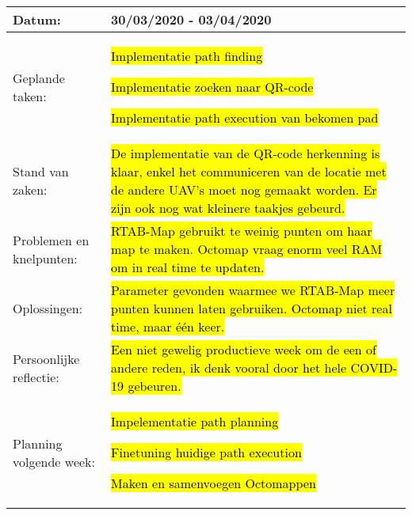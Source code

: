 \begin{tabularx}{\textwidth}{| l | X |}
    \hline
    Datum: & 30/03/2020 - 03/04/2020\\
    \hline
    Geplande taken: &
    \begin{compactitem}
      \item \hl{Implementatie path finding}
      \item \hl{Implementatie zoeken naar QR-code}
      \item \hl{Implementatie path execution van bekomen pad}
    \end{compactitem}\\
    \hline
    Stand van zaken: & \hl{De implementatie van de QR-code herkenning is klaar, enkel het communiceren van de locatie met de andere UAV's moet nog gemaakt worden. Er zijn ook nog wat kleinere taakjes gebeurd.}\\
    \hline
    Problemen en knelpunten: & \hl{RTAB-Map gebruikt te weinig punten om haar map te maken. Octomap vraag enorm veel RAM om in real time te updaten.}\\
    \hline
    Oplossingen: & \hl{Parameter gevonden waarmee we RTAB-Map meer punten kunnen laten gebruiken. Octomap niet real time, maar \'e\'en keer.}\\
    \hline
    Persoonlijke reflectie: & \hl{Een niet gewelig productieve week om de een of andere reden, ik denk vooral door het hele COVID-19 gebeuren.}\\
    \hline
    Planning volgende week: &
    \begin{compactitem}
      \item \hl{Impelementatie path planning}
      \item \hl{Finetuning huidige path execution}
      \item \hl{Maken en samenvoegen Octomappen}
    \end{compactitem}\\
    \hline
  \end{tabularx}